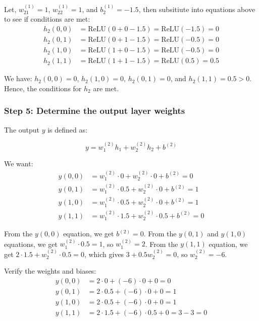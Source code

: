 \documentclass{article}
\begin{document}
{Let, $w_{21}^{(1)} = 1$, $w_{22}^{(1)} = 1$, and $b_2^{(1)} = -1.5$, then subsitiute into equations above to see if conditions are met:
\begin{align*}
h_2(0,0) &= \text{ReLU}(0 + 0 - 1.5) = \text{ReLU}(-1.5) = 0\\
h_2(0,1) &= \text{ReLU}(0 + 1 - 1.5) = \text{ReLU}(-0.5) = 0\\
h_2(1,0) &= \text{ReLU}(1 + 0 - 1.5) = \text{ReLU}(-0.5) = 0\\
h_2(1,1) &= \text{ReLU}(1 + 1 - 1.5) = \text{ReLU}(0.5) = 0.5
\end{align*}
}

We have: $h_2(0,0) = 0$, $h_2(1,0) = 0$, $h_2(0,1) = 0$, and $h_2(1,1) = 0.5 > 0$.
Hence, the conditions for $h_2$ are met.

\subsubsection*{Step 5: Determine the output layer weights}
\parbox{\textwidth}{
The output $y$ is defined as:

$$y = w_{1}^{(2)}h_1 + w_{2}^{(2)}h_2 + b^{(2)}$$

We want:
\begin{align*}
y(0,0) &= w_{1}^{(2)} \cdot 0 + w_{2}^{(2)} \cdot 0 + b^{(2)} = 0\\
y(0,1) &= w_{1}^{(2)} \cdot 0.5 + w_{2}^{(2)} \cdot 0 + b^{(2)} = 1\\
y(1,0) &= w_{1}^{(2)} \cdot 0.5 + w_{2}^{(2)} \cdot 0 + b^{(2)} = 1\\
y(1,1) &= w_{1}^{(2)} \cdot 1.5 + w_{2}^{(2)} \cdot 0.5 + b^{(2)} = 0
\end{align*}

From the $y(0,0)$ equation, we get $b^{(2)} = 0$.
From the $y(0,1)$ and $y(1,0)$ equations, we get $w_{1}^{(2)} \cdot 0.5 = 1$, so $w_{1}^{(2)} = 2$.
From the $y(1,1)$ equation, we get $2 \cdot 1.5 + w_{2}^{(2)} \cdot 0.5 = 0$, which gives $3 + 0.5w_{2}^{(2)} = 0$, so $w_{2}^{(2)} = -6$.

Verify the weights and biases:
\begin{align*}
y(0,0) &= 2 \cdot 0 + (-6) \cdot 0 + 0 = 0 \\
y(0,1) &= 2 \cdot 0.5 + (-6) \cdot 0 + 0 = 1 \\
y(1,0) &= 2 \cdot 0.5 + (-6) \cdot 0 + 0 = 1 \\
y(1,1) &= 2 \cdot 1.5 + (-6) \cdot 0.5 + 0 = 3 - 3 = 0 
\end{align*}
}
\end{document}
